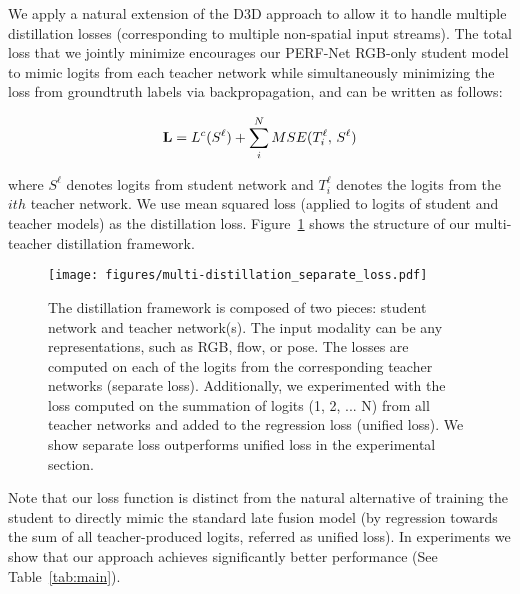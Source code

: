 \documentclass[10pt,twocolumn,letterpaper]{article}
\begin{document}
We apply a natural extension of the D3D approach to allow it to handle multiple distillation
losses (corresponding to multiple non-spatial input streams). The total loss that we jointly minimize encourages our  PERF-Net RGB-only student model to
 mimic  logits from each teacher network while simultaneously 
 minimizing the loss from groundtruth labels via backpropagation, 
 and can be written as follows:
 


\vspace{-0.2cm}
{\footnotesize
\begin{equation}
\textbf{L} = {L^c}({S^\ell}) + \sum\limits_i^N {{MSE}(T_i^\ell,\,{S^\ell})}\vspace{-3mm}
\end{equation}
}

\noindent where ${S^\ell}$ denotes logits from student network and $T_i^\ell$ denotes the logits from the $ith$ teacher network.  We use mean squared loss (applied to logits of student and teacher models) as the distillation loss. Figure~\ref{fig:distillation} shows the structure of our multi-teacher distillation framework. 

\begin{figure}[t!]
    \centering
    \texttt{[image: figures/multi-distillation\_separate\_loss.pdf]}
    \caption{ The distillation framework is composed of two pieces: student network and teacher network(s). The input modality can be any representations, such as RGB, flow, or pose. The losses are computed on each of the logits from the corresponding teacher networks (separate loss). Additionally, we experimented with the loss computed on the summation of logits (1, 2, ... N) from all teacher networks and added to the regression loss (unified loss). We show separate loss outperforms unified loss in the experimental section.}
    \label{fig:distillation}
\end{figure}

Note that our loss function is distinct from the natural alternative of training the student to directly mimic the standard late fusion model (by regression towards the sum of all teacher-produced logits, referred as unified loss).  In experiments we show that our approach achieves significantly better performance (See Table~\ref{tab:main}).
\end{document}
